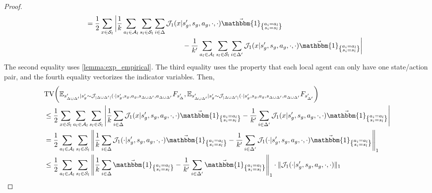 \documentclass{article}
\theoremstyle{plain}
\theoremstyle{definition}
\def\E{\mathbb{E}}
\begin{document}
\begin{proof}
\begin{align*}
    &\quad\quad= \frac{1}{2}\sum_{x\in\mathcal{S}_l}\bigg|\frac{1}{k}\sum_{a_l\in\mathcal{A}_l}\sum_{s_l\in\mathcal{S}_l}\sum_{i\in\Delta}\mathcal{J}_{1}(x|s_g', s_g, a_g, \cdot, \cdot)\vec{\mathbbm{1}}_{\left\{\substack{a_i = a_l\\ s_i = s_l}\right\}} \\
    &\quad\quad\quad\quad\quad\quad\quad\quad\quad\quad\quad\quad\quad\quad\quad\quad-\frac{1}{k'}\sum_{a_l\in\mathcal{A}_l}\sum_{s_l\in\mathcal{S}_l}\sum_{i\in\Delta'}\mathcal{J}_{1}(x|s_g',s_g,a_g,\cdot, \cdot)\vec{\mathbbm{1}}_{\left\{\substack{a_i = a_l \\ s_i =s_l}\right\}}\bigg|
\end{align*}
The second equality uses \cref{lemma:exp_empirical}. The third equality uses the property that each local agent can only have one state/action pair, and the fourth equality vectorizes the indicator variables. Then,
\begin{align*}
&\mathrm{TV}\bigg(\E_{s'_{\Delta\cup\Delta'}|s_g' \sim \mathcal{J}_{|\Delta\cup\Delta'|}(\cdot|s_g',s_g,a_g,s_{\Delta\cup\Delta'},a_{\Delta\cup\Delta'}}F_{s'_\Delta},\E_{s'_{\Delta\cup\Delta'}|s_g' \sim \mathcal{J}_{|\Delta\cup\Delta'|}(\cdot|s_g',s_g,a_g,s_{\Delta\cup\Delta'},a_{\Delta\cup\Delta'}}F_{s'_{\Delta'}}\bigg) \\
&\leq \frac{1}{2}\sum_{x\in\mathcal{S}_l}\sum_{a_l\in\mathcal{A}_l}\sum_{s_l\in\mathcal{S}_l}\left|\frac{1}{k}\sum_{i\in\Delta}\mathcal{J}_{1}(x|s_g', s_g, a_g, \cdot, \cdot)\vec{\mathbbm{1}}_{\left\{\substack{a_i = a_l\\ s_i = s_l}\right\}} -\frac{1}{k'}\sum_{i\in\Delta'}\mathcal{J}_{1}(x|s_g',s_g,a_g,\cdot, \cdot)\vec{\mathbbm{1}}_{\left\{\substack{a_i = a_l \\ s_i =s_l}\right\}}\right|\\
&= \frac{1}{2}\sum_{a_l\in\mathcal{A}_l}\sum_{s_l\in\mathcal{S}_l}\left\|\frac{1}{k}\sum_{i\in\Delta}\mathcal{J}_{1}(\cdot|s_g', s_g, a_g, \cdot, \cdot)\vec{\mathbbm{1}}_{\left\{\substack{a_i = a_l\\ s_i = s_l}\right\}} -\frac{1}{k'}\sum_{i\in\Delta'}\mathcal{J}_{1}(\cdot|s_g',s_g,a_g,\cdot, \cdot)\vec{\mathbbm{1}}_{\left\{\substack{a_i = a_l \\ s_i =s_l}\right\}}\right\|_1\\
&\leq \frac{1}{2}\sum_{a_l\in\mathcal{A}_l}\sum_{s_l\in\mathcal{S}_l}\left\|\frac{1}{k}\sum_{i\in\Delta}\vec{\mathbbm{1}}_{\left\{\substack{a_i = a_l\\ s_i = s_l}\right\}} -\frac{1}{k'}\sum_{i\in\Delta'}\vec{\mathbbm{1}}_{\left\{\substack{a_i = a_l \\ s_i =s_l}\right\}}\right\|_1\cdot \|\mathcal{J}_{1}(\cdot|s_g',s_g,a_g,\cdot, \cdot)\|_1\\

\end{align*}
\end{proof}
\end{document}
